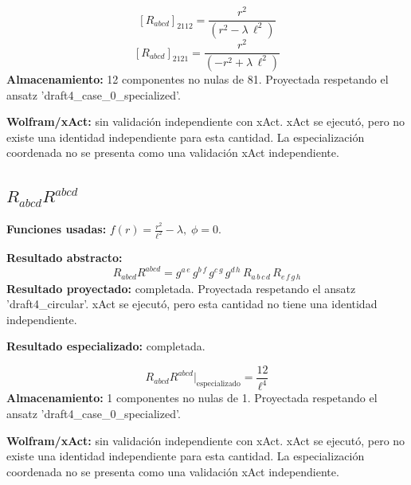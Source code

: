 \documentclass[11pt]{article}
\begin{document}
\begin{dmath*}[breakdepth={5}]
\left[R_{abcd}\right]_{2112} = \frac{{r}^{2}}{\left({r}^{2} - \lambda\,{\ell}^{2}\right)}
\end{dmath*}
\begin{dmath*}[breakdepth={5}]
\left[R_{abcd}\right]_{2121} = \frac{{r}^{2}}{\left(-{r}^{2} + \lambda\,{\ell}^{2}\right)}
\end{dmath*}
\textbf{Almacenamiento:} 12 componentes no nulas de 81. Proyectada respetando el ansatz 'draft4\_case\_0\_specialized'.\par
\textbf{Wolfram/xAct:} sin validación independiente con xAct. xAct se ejecutó, pero no existe una identidad independiente para esta cantidad. La especialización coordenada no se presenta como una validación xAct independiente.\par\medskip
{}
\subsection*{$ R_{abcd}R^{abcd} $}
\textbf{Funciones usadas:} $ f\!\left(r\right) = \frac{{r}^{2}}{{\ell}^{2}} - \lambda,\;\phi=0 $.\par
\textbf{Resultado abstracto:}
\begin{dmath*}[breakdepth={5}]
R_{abcd}R^{abcd} = g{}^{a\,e}\,g{}^{b\,f}\,g{}^{c\,g}\,g{}^{d\,h}\,R{}_{a\,b\,c\,d}\,R{}_{e\,f\,g\,h}
\end{dmath*}
\textbf{Resultado proyectado:} completada. Proyectada respetando el ansatz 'draft4\_circular'. xAct se ejecutó, pero esta cantidad no tiene una identidad independiente.\par
\textbf{Resultado especializado:} completada.\par
\begin{dmath*}[breakdepth={5}]
R_{abcd}R^{abcd}\big|_{\mathrm{especializado}} = \frac{12}{{\ell}^{4}}
\end{dmath*}
\textbf{Almacenamiento:} 1 componentes no nulas de 1. Proyectada respetando el ansatz 'draft4\_case\_0\_specialized'.\par
\textbf{Wolfram/xAct:} sin validación independiente con xAct. xAct se ejecutó, pero no existe una identidad independiente para esta cantidad. La especialización coordenada no se presenta como una validación xAct independiente.\par\medskip
{}
\end{document}
